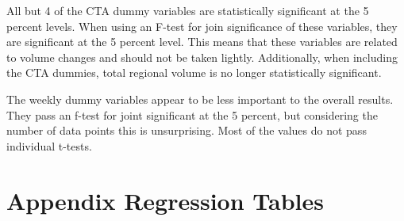\documentclass{article}
\begin{document}
All but 4 of the CTA dummy variables are statistically significant at the 5 percent levels. When using an F-test for join significance of these variables, they are significant at the 5 percent level. This means that these variables are related to volume changes and should not be taken lightly. Additionally, when including the CTA dummies, total regional volume is no longer statistically significant. 

The weekly dummy variables appear to be less important to the overall results. They pass an f-test for joint significant at the 5 percent, but considering the number of data points this is unsurprising. Most of the values do not pass individual t-tests.


{}


\appendix

\section{Appendix Regression Tables}
\end{document}
